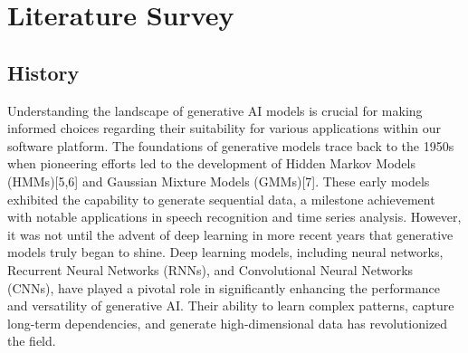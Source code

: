 \documentclass[conference]{IEEEtran}
\begin{document}
\section{Literature Survey}

\subsection{History}

Understanding the landscape of generative AI models is crucial for making informed choices regarding their suitability for various applications within our software platform. The foundations of generative models trace back to the 1950s when pioneering efforts led to the development of Hidden Markov Models (HMMs)[5,6] and Gaussian Mixture Models (GMMs)[7]. These early models exhibited the capability to generate sequential data, a milestone achievement with notable applications in speech recognition and time series analysis. However, it was not until the advent of deep learning in more recent years that generative models truly began to shine. Deep learning models, including neural networks, Recurrent Neural Networks (RNNs), and Convolutional Neural Networks (CNNs), have played a pivotal role in significantly enhancing the performance and versatility of generative AI. Their ability to learn complex patterns, capture long-term dependencies, and generate high-dimensional data has revolutionized the field.
\end{document}

